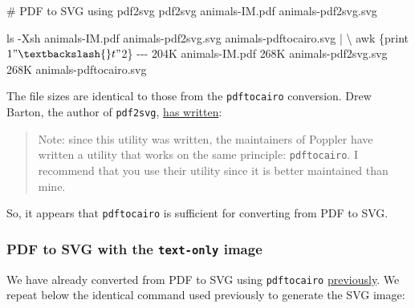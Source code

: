 \documentclass[
  11pt,
  british,
  a4paper,
]{article}
\newenvironment{Shaded}{\begin{snugshade}}{\end{snugshade}}
\newcommand{\AttributeTok}[1]{\textcolor[rgb]{0.80,0.80,0.80}{#1}}
\newcommand{\CommentTok}[1]{\textcolor[rgb]{0.50,0.62,0.50}{#1}}
\newcommand{\DataTypeTok}[1]{\textcolor[rgb]{0.87,0.87,0.75}{#1}}
\newcommand{\ExtensionTok}[1]{\textcolor[rgb]{0.80,0.80,0.80}{#1}}
\newcommand{\FunctionTok}[1]{\textcolor[rgb]{0.94,0.94,0.56}{#1}}
\newcommand{\KeywordTok}[1]{\textcolor[rgb]{0.94,0.87,0.69}{#1}}
\newcommand{\NormalTok}[1]{\textcolor[rgb]{0.80,0.80,0.80}{#1}}
\newcommand{\StringTok}[1]{\textcolor[rgb]{0.80,0.58,0.58}{#1}}
\begin{document}
\begin{Shaded}
\begin{Highlighting}[]
\CommentTok{\# PDF to SVG using pdf2svg}
\ExtensionTok{pdf2svg}\NormalTok{ animals{-}IM.pdf animals{-}pdf2svg.svg}

\FunctionTok{ls} \AttributeTok{{-}Xsh}\NormalTok{ animals{-}IM.pdf animals{-}pdf2svg.svg animals{-}pdftocairo.svg }\KeywordTok{|} \DataTypeTok{\textbackslash{}}
\FunctionTok{awk} \StringTok{\textquotesingle{}\{print $1 "\textbackslash{}t" $2\}\textquotesingle{}}
\ExtensionTok{{-}{-}{-}}
\ExtensionTok{204K}\NormalTok{    animals{-}IM.pdf}
\ExtensionTok{268K}\NormalTok{    animals{-}pdf2svg.svg}
\ExtensionTok{268K}\NormalTok{    animals{-}pdftocairo.svg}
\end{Highlighting}
\end{Shaded}

The file sizes are identical to those from the \texttt{pdftocairo}
conversion. Drew Barton, the author of \texttt{pdf2svg},
\href{https://cityinthesky.co.uk/opensource/pdf2svg/}{has written}:

\begin{quote}
Note: since this utility was written, the maintainers of Poppler have
written a utility that works on the same principle: \texttt{pdftocairo}.
I recommend that you use their utility since it is better maintained
than mine.
\end{quote}

So, it appears that \texttt{pdftocairo} is sufficient for converting
from PDF to SVG.

\hypertarget{pdf-to-svg-with-the-text-only-image}{%
\subsubsection{\texorpdfstring{PDF to SVG with the \texttt{text-only}
image}{PDF to SVG with the text-only image}}\label{pdf-to-svg-with-the-text-only-image}}

We have already converted from PDF to SVG using \texttt{pdftocairo}
\protect\hyperlink{generating-an-svg-from-a-pdf}{previously}. We repeat
below the identical command used previously to generate the SVG image:
\end{document}
